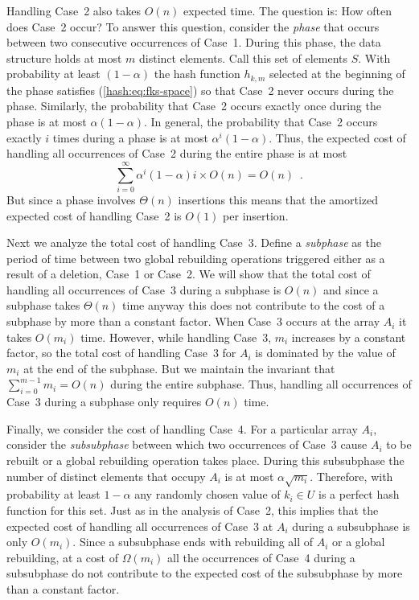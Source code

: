 Handling Case~2 also takes $O(n)$ expected time.  The question is: How
often does Case~2 occur?  To answer this question, consider the
\emph{phase} that occurs between two consecutive
occurrences of Case~1.  During this phase, the data structure holds at
most $m$ distinct elements.  Call this set of elements $S$.  With
probability at least $(1-\alpha)$ the hash function $h_{k,m}$ selected
at the beginning of the phase satisfies (\ref{hash:eq:fks-space}) so
that Case~2 never occurs during the phase.  Similarly, the probability
that Case~2 occurs exactly once during the phase is at most
$\alpha(1-\alpha)$.  In general, the probability that Case~2 occurs
exactly $i$ times during a phase is at most $\alpha^i(1-\alpha)$.  Thus, the
expected cost of handling all occurrences of Case~2 during the entire
phase is at most 
\[ \sum_{i=0}^\infty \alpha^i(1-\alpha)i\times O(n) =
	O(n) \enspace .  
\] 
But since a phase involves $\Theta(n)$ insertions this means that the
amortized expected cost of handling Case~2 is $O(1)$ per insertion.

Next we analyze the total cost of handling Case~3.  Define a
\emph{subphase} as the period of time between two
global rebuilding operations triggered either as a result of a
deletion, Case~1 or Case~2.   We will show that the total cost of
handling all occurrences of Case~3 during a subphase is $O(n)$ and
since a subphase takes $\Theta(n)$ time anyway this does not
contribute to the cost of a subphase by more than a constant factor.
When Case~3 occurs at the array $A_i$ it takes $O(m_i)$ time.
However, while handling Case~3, $m_i$ increases by a constant factor,
so the total cost of handling Case~3 for $A_i$ is dominated by the
value of $m_i$ at the end of the subphase.  But we maintain the
invariant that $\sum_{i=0}^{m-1} m_i = O(n)$ during the entire
subphase.  Thus, handling all occurrences of Case~3 during a subphase
only requires $O(n)$ time. 

Finally, we consider the cost of handling Case~4.  For a particular
array $A_i$, consider the \emph{subsubphase}
between which two occurrences of Case~3 cause $A_i$ to be rebuilt or a
global rebuilding operation takes place.  During this subsubphase the
number of distinct elements that occupy $A_i$ is at most
$\alpha\sqrt{m_i}$.  Therefore, with probability at least $1-\alpha$
any randomly chosen value of $k_i\in U$ is a perfect hash function for
this set.   Just as in the analysis of Case~2, this implies that the
expected cost of handling all occurrences of Case~3 at $A_i$ during a
subsubphase is only $O(m_i)$.  Since a subsubphase ends with
rebuilding all of $A_i$ or a global rebuilding, at a cost of
$\Omega(m_i)$ all the occurrences of Case~4 during a subsubphase do not
contribute to the expected cost of the subsubphase by more than a
constant factor.

